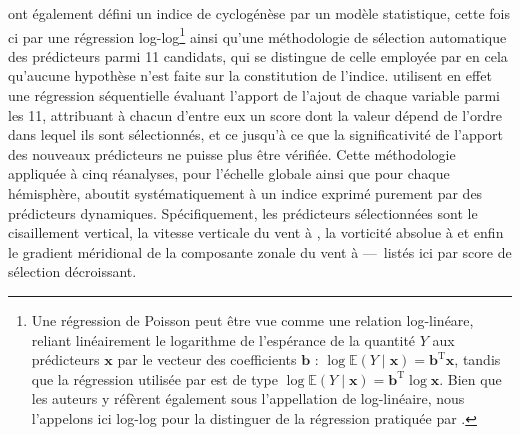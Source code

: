 \documentclass[../main.tex]{subfiles}
\begin{document}
\textcite{wang_dynamic_2020} ont également défini un indice de cyclogénèse par un modèle statistique, cette fois ci par une régression log-log\footnote{Une
régression de Poisson peut être vue comme une relation log-linéare, reliant linéairement le logarithme de l'espérance de la quantité $Y$ aux prédicteurs
$\mathbf{x}$ par le vecteur des coefficients $\mathbf{b}$ : $\log \mathbb{E} (Y \mid \mathbf{x}) = \mathbf{b}^{\mathrm{T}} \mathbf{x}$, tandis que la
régression utilisée par \textcite{wang_dynamic_2020} est de type $\log \mathbb{E}(Y \mid \mathbf{x}) = \mathbf{b}^{\mathrm{T}} \log \mathbf{x}$. Bien que
les auteurs y réfèrent également sous l'appellation de log-linéaire, nous l'appelons ici log-log pour la distinguer de la régression pratiquée par
\citeauthor{tippett_poisson_2011}.} ainsi qu'une méthodologie de sélection automatique des prédicteurs parmi \num{11} candidats, qui se distingue de celle
employée par \textcite{tippett_poisson_2011} en cela qu'aucune hypothèse n'est faite sur la constitution de l'indice. \textcite{wang_dynamic_2020} utilisent
en effet une régression séquentielle évaluant l'apport de l'ajout de chaque variable parmi les \num{11}, attribuant à chacun d'entre eux un score dont la valeur
dépend de l'ordre dans lequel ils sont sélectionnés, et ce jusqu'à ce que la significativité de l'apport des nouveaux prédicteurs ne puisse plus être vérifiée.
Cette méthodologie appliquée à cinq réanalyses, pour l'échelle globale ainsi que pour chaque hémisphère, aboutit systématiquement à un indice exprimé purement
par des prédicteurs dynamiques. Spécifiquement, les prédicteurs sélectionnées sont le cisaillement vertical, la vitesse verticale du vent à , la
vorticité absolue à  et enfin le gradient méridional de la composante zonale du vent à  ---~listés ici par score de sélection décroissant.
\end{document}
